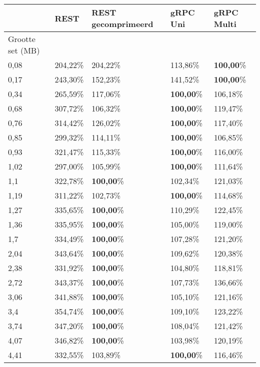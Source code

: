 \begin{table}
    \centering
    \begin{tabular}{lllll}
        \toprule
         & \textbf{REST} & \textbf{REST gecomprimeerd} & \textbf{gRPC Uni} & \textbf{gRPC Multi} \\
        \midrule
        Grootte set (MB) &  &  & \\
        0,08 & 204,22\% & 204,22\% & 113,86\% & \textbf{100,00}\% \\
        0,17 & 243,30\% & 152,23\% & 141,52\% & \textbf{100,00}\% \\
        0,34 & 265,59\% & 117,06\% & \textbf{100,00}\% & 106,18\% \\
        0,68 & 307,72\% & 106,32\% & \textbf{100,00}\% & 119,47\% \\
        0,76 & 314,42\% & 126,02\% & \textbf{100,00}\% & 117,40\% \\
        0,85 & 299,32\% & 114,11\% & \textbf{100,00}\% & 106,85\% \\
        0,93 & 321,47\% & 115,33\% & \textbf{100,00}\% & 116,00\% \\
        1,02 & 297,00\% & 105,99\% & \textbf{100,00}\% & 111,64\% \\
        1,1 & 322,78\% & \textbf{100,00}\% & 102,34\% & 121,03\% \\
        1,19 & 311,22\% & 102,73\% & \textbf{100,00}\% & 114,68\% \\
        1,27 & 335,65\% & \textbf{100,00}\% & 110,29\% & 122,45\% \\
        1,36 & 335,95\% & \textbf{100,00}\% & 105,00\% & 119,00\% \\
        1,7 & 334,49\% & \textbf{100,00}\% & 107,28\% & 121,20\% \\
        2,04 & 343,64\% & \textbf{100,00}\% & 109,62\% & 120,38\% \\
        2,38 & 331,92\% & \textbf{100,00}\% & 104,80\% & 118,81\% \\
        2,72 & 343,37\% & \textbf{100,00}\% & 107,73\% & 136,66\% \\
        3,06 & 341,88\% & \textbf{100,00}\% & 105,10\% & 121,16\% \\
        3,4 & 354,74\% & \textbf{100,00}\% & 109,10\% & 123,22\% \\
        3,74 & 347,20\% & \textbf{100,00}\% & 108,04\% & 121,42\% \\
        4,07 & 346,82\% & \textbf{100,00}\% & 103,98\% & 120,19\% \\
        4,41 & 332,55\% & 103,89\% & \textbf{100,00}\% & 116,46\% \\

\end{tabular}
\end{table}

